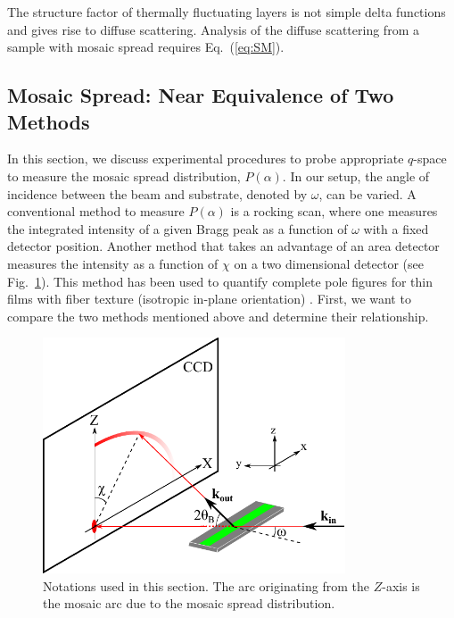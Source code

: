 The structure factor of thermally fluctuating layers is not simple delta functions
and gives rise to diffuse scattering. Analysis of the diffuse scattering 
from a sample with mosaic spread requires Eq.~(\ref{eq:SM}).

\subsection{Mosaic Spread: Near Equivalence of Two Methods}\label{app:mosaic_exp}
In this section, we discuss experimental procedures to probe appropriate 
$q$-space
to measure the mosaic spread distribution, $P(\alpha)$. In our setup, the angle of 
incidence between the beam and substrate, denoted by $\omega$, can be varied. A 
conventional method to measure $P(\alpha)$ is a rocking scan, where
one measures the integrated intensity of a given Bragg peak as a function of 
$\omega$ with a fixed detector position. Another method that takes an advantage
of an area detector \cite{Rodriguez-Navarro07} 
measures the intensity as a function of $\chi$ on a two
dimensional detector (see Fig.~\ref{fig:ring_setup}). This method has been used
to quantify complete pole figures for thin films with fiber texture (isotropic 
in-plane orientation) \cite{Baker10}.
First, we want to compare the two methods mentioned 
above and determine their relationship.

\begin{figure}
  \centering
  \includegraphics[width=0.8\textwidth]{figures/ripple/mosaic/ring_setup}
  \caption{Notations used in this section. The arc originating from the $Z$-axis
  is the mosaic arc due to the mosaic spread distribution.}
  \label{fig:ring_setup}
\end{figure}

